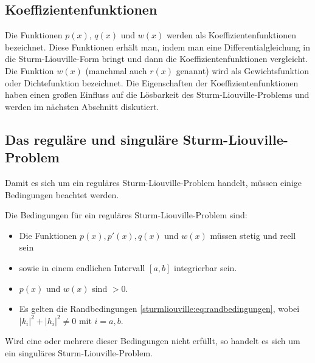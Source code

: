 \subsection{Koeffizientenfunktionen
\label{sturmliouville:sub:koeffizientenfunktionen}}
Die Funktionen $p(x)$, $q(x)$ und $w(x)$ werden als Koeffizientenfunktionen 
bezeichnet.
Diese Funktionen erhält man, indem man eine Differentialgleichung in die
Sturm-Liouville-Form bringt und dann die Koeffizientenfunktionen vergleicht.
Die Funktion $w(x)$ (manchmal auch $r(x)$ genannt) wird als Gewichtsfunktion
oder Dichtefunktion bezeichnet.
Die Eigenschaften der Koeffizientenfunktionen haben
einen großen Einfluss auf die Lösbarkeit des Sturm-Liouville-Problems und werden
im nächsten Abschnitt diskutiert.

%
%

\subsection{Das reguläre und singuläre Sturm-Liouville-Problem
\label{sturmliouville:sub:reguläre_sturm_liouville_problem}}
Damit es sich um ein reguläres Sturm-Liouville-Problem handelt, müssen einige
Bedingungen beachtet werden.
\begin{definition}
	\label{sturmliouville:def:reguläres_sturm-liouville-problem}
	Die Bedingungen für ein reguläres Sturm-Liouville-Problem sind:
	\begin{itemize}
		\item Die Funktionen $p(x), p'(x), q(x)$ und $w(x)$ müssen stetig und
		reell sein
		\item sowie in einem endlichen Intervall $[a,b]$ integrierbar
		sein.
		\item $p(x)$ und $w(x)$ sind $>0$.
		\item Es gelten die Randbedingungen 
		\eqref{sturmliouville:eq:randbedingungen}, wobei
		$|k_i|^2 + |h_i|^2\ne 0$ mit $i=a,b$.
	\end{itemize}
\end{definition}
Wird eine oder mehrere dieser Bedingungen nicht erfüllt, so handelt es sich um
ein singuläres Sturm-Liouville-Problem.

